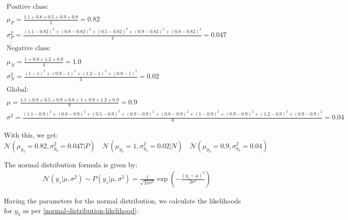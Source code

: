 \documentclass[12pt]{article}
\begin{document}
\begin{enumerate}[leftmargin=\labelsep]
    \vspace{10pt}
\[
\begin{array}{ll}
    \text{Positive class:} & \\
    \\
    \mu_P = \frac{1.1 + 0.8 + 0.5 + 0.9 + 0.8}{5} = 0.82 \\[10pt]
    \sigma_P^2 = \frac{(1.1 - 0.82)^2 + (0.8 - 0.82)^2 + (0.5 - 0.82)^2 + (0.9 - 0.82)^2 + (0.8 - 0.82)^2}{4} = 0.047 \\[10pt]
    \\
    \text{Negative class:} & \\
    \\
    \mu_N = \frac{1 + 0.9 + 1.2 + 0.9}{4} = 1.0 \\[10pt]
    \sigma_N^2 = \frac{(1 - 1)^2 + (0.9 - 1)^2 + (1.2 - 1)^2 + (0.9 - 1)^2}{3} = 0.02 \\[10pt]
    \\
    \text{Global:} & \\
    \\
    \mu = \frac{1.1 + 0.8 + 0.5 + 0.9 + 0.8 + 1 + 0.9 + 1.2 + 0.9}{9} = 0.9 \\[10pt]
    \sigma^2 = \frac{(1.1 - 0.9)^2 + (0.8 - 0.9)^2 + (0.5 - 0.9)^2 + (0.9 - 0.9)^2 + (0.8 - 0.9)^2 + (1 - 0.9)^2 + (0.9 - 0.9)^2 + (1.2 - 0.9)^2 + (0.9 - 0.9)^2}{8} = 0.04
\end{array}
\]


\vspace{10pt}
With this, we get:
\begin{equation*}
    \mathcal{N}(\mu_{y_3} = 0.82, \sigma_{y_3}^2 = 0.047|P) \quad \mathcal{N}(\mu_{y_3} = 1, \sigma_{y_3}^2 = 0.02|N) \quad \mathcal{N}(\mu_{y_3} = 0.9, \sigma_{y_3}^2 = 0.04)  
\end{equation*}

\vspace{10pt}
    The normal distribution formula is given by:
    \begin{equation}\label{normal-distribution-likelihood}
        \begin{aligned}
            \mathcal{N}(y_z|\mu, \sigma^2) \sim P(y_z|\mu, \sigma^2) = \frac{1}{\sqrt{2\pi \sigma^2}} \exp\left(-\frac{(y_z - \mu)^2}{2\sigma^2}\right)
        \end{aligned}
    \end{equation}

    \newpage
    Having the parameters for the normal distribution, we calculate the likelihoods for $y_3$ as per \eqref{normal-distribution-likelihood}:
    

\end{enumerate}
\end{document}
